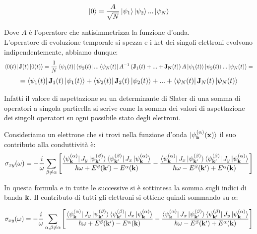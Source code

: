 \documentclass[12pt,a4paper]{article}
\begin{document}
\[
\ket{0} = \frac{A}{\sqrt{N}}\ket{\psi_1}\ket{\psi_2} ... \ket{\psi_N}
\]

Dove $A$ è l'operatore che antisimmetrizza la funzione d'onda.\\
L'operatore di evoluzione temporale si spezza e i ket dei singoli elettroni evolvono indipendentemente, abbiamo dunque:
\[
\bra{0(t)} \mathbf{J}(t) \ket{0(t)}  = \frac{1}{N}\bra{\psi_1(t)} \bra{\psi_2 (t)} ... \bra{\psi_N (t)} A^{-1} \left( \bold{J}_1 (t) + ... +  \bold{J_N} (t) \right) A \ket{\psi_1(t)} \ket{\psi_2 (t)} ... \ket{\psi_N (t)} = 
\]
\[
= \bra{\psi_1(t)} \bold{J}_1 (t) \ket{\psi_1(t)} + \bra{\psi_2(t)} \bold{J}_2 (t) \ket{\psi_2(t)} + ... + \bra{\psi_N(t)} \bold{J}_N (t)  \ket{\psi_N(t)}
\]

Infatti il valore di aspettazione su un determinante di Slater di una somma di operatori a singola particella si scrive come la somma dei valori di aspettazione dei singoli operatori su ogni possibile stato degli elettroni.

Consideriamo un elettrone che si trovi nella funzione d'onda $\ket{\psi^{(\alpha)}_{\mathbf{k}} (\mathbf{x})}$ il suo contributo alla conduttività è: 
\begin{equation}
\sigma_{xy} (\omega) = -  \frac{i}{\omega} \sum_{\beta \neq \alpha} \left[ \frac{ \bra{\psi^{(\alpha)}_{\mathbf{k}}} J_{y}  \ket{\psi^{(\beta)}_{\mathbf{k'}}} \bra{\psi^{(\beta)}_{\mathbf{k'}  }} J_{x} \ket{\psi^{(\alpha)}_{\mathbf{k}} }}{\hbar \omega + E^{\beta}(\mathbf{k'}) - E^{\alpha}(\mathbf{k})} -
 \frac{ \bra{\psi^{(\alpha)}_{\mathbf{k}} } J_{x}  \ket{\psi^{(\beta)}_{\mathbf{k'}} } \bra{\psi^{(\beta)}_{\mathbf{k'}} } J_{y} \ket{\psi^{(\alpha)}_{\mathbf{k}}}}{\hbar \omega - E^{\beta}(\mathbf{k'}) + E^{\alpha}(\mathbf{k})}
\right]
\end{equation}


In questa formula e in tutte le successive si è sottintesa la somma sugli indici di banda $\bold{k}$.
Il contributo di tutti gli elettroni si ottiene quindi sommando su $\alpha$:

\begin{equation}
\sigma_{xy} (\omega) = - \frac{i}{\omega} \sum_{\alpha, \beta \neq \alpha} \left[ \frac{ \bra{\psi^{(\alpha)}_{\mathbf{k}}} J_{y}  \ket{\psi^{(\beta)}_{\mathbf{k'}}} \bra{\psi^{(\beta)}_{\mathbf{k'}  }} J_{x} \ket{\psi^{(\alpha)}_{\mathbf{k}} }}{\hbar \omega + E^{\beta}(\mathbf{k'}) - E^{\alpha}(\mathbf{k})} -
 \frac{ \bra{\psi^{(\alpha)}_{\mathbf{k}} } J_{x}  \ket{\psi^{(\beta)}_{\mathbf{k'}} } \bra{\psi^{(\beta)}_{\mathbf{k'}} } J_{y} \ket{\psi^{(\alpha)}_{\mathbf{k}}}}{\hbar \omega - E^{\beta}(\mathbf{k'}) + E^{\alpha}(\mathbf{k})}
\right]
\end{equation}
\end{document}
